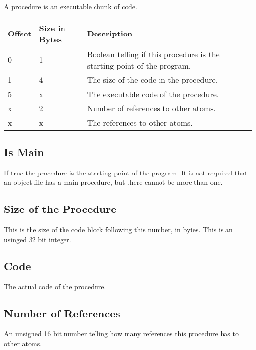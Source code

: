 A procedure is an executable chunk of code.

\begin{table}[h]
    \centering
    \label{tbl:procedure}
    \begin{tabular}{|l|l|l|}
        \hline
        \textbf{Offset} & \textbf{Size in Bytes} & \textbf{Description}                                                    \\ \hline
        0               & 1                      & Boolean telling if this procedure is the starting point of the program. \\ \hline
        1               & 4                      & The size of the code in the procedure.                                  \\ \hline
        5               & x                      & The executable code of the procedure.                                   \\ \hline
        x               & 2                      & Number of references to other atoms.                                    \\ \hline
        x               & x                      & The references to other atoms.                                          \\ \hline
    \end{tabular}
\end{table}

\subsection{Is Main}
If true the procedure is the starting point of the program. It is not required 
that an object file has a main procedure, but there cannot be more than one.

\subsection{Size of the Procedure}
This is the size of the code block following this number, in bytes. This is an
usinged 32 bit integer.

\subsection{Code}
The actual code of the procedure.

\subsection{Number of References}
An unsigned 16 bit number telling how many references this procedure has to 
other atoms.

